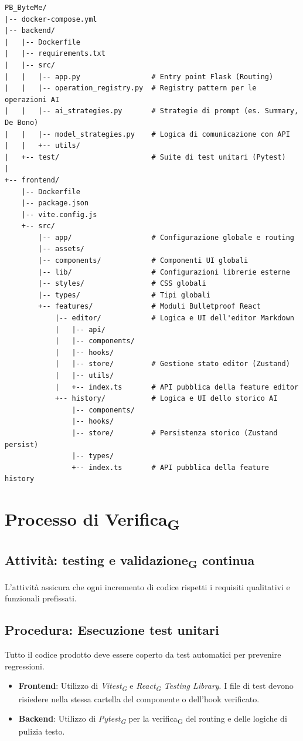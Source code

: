 \documentclass[11pt,a4paper]{article}
\newcommand{\gls}[1]{#1\textsubscript{G}}
\begin{document}
\begin{verbatim}
PB_ByteMe/
|-- docker-compose.yml
|-- backend/
|   |-- Dockerfile
|   |-- requirements.txt
|   |-- src/
|   |   |-- app.py                 # Entry point Flask (Routing)
|   |   |-- operation_registry.py  # Registry pattern per le operazioni AI
|   |   |-- ai_strategies.py       # Strategie di prompt (es. Summary, De Bono)
|   |   |-- model_strategies.py    # Logica di comunicazione con API
|   |   +-- utils/
|   +-- test/                      # Suite di test unitari (Pytest)
|
+-- frontend/
    |-- Dockerfile
    |-- package.json
    |-- vite.config.js
    +-- src/
        |-- app/                   # Configurazione globale e routing
        |-- assets/
        |-- components/            # Componenti UI globali
        |-- lib/                   # Configurazioni librerie esterne
        |-- styles/                # CSS globali
        |-- types/                 # Tipi globali
        +-- features/              # Moduli Bulletproof React
            |-- editor/            # Logica e UI dell'editor Markdown
            |   |-- api/
            |   |-- components/
            |   |-- hooks/
            |   |-- store/         # Gestione stato editor (Zustand)
            |   |-- utils/
            |   +-- index.ts       # API pubblica della feature editor
            +-- history/           # Logica e UI dello storico AI
                |-- components/
                |-- hooks/
                |-- store/         # Persistenza storico (Zustand persist)
                |-- types/
                +-- index.ts       # API pubblica della feature history
\end{verbatim}

\newpage

\section{Processo di \gls{Verifica}}
\subsection{Attività: testing e \gls{validazione} continua}
L'attività assicura che ogni incremento di codice rispetti i requisiti qualitativi e funzionali prefissati.

\subsection{Procedura: Esecuzione test unitari}
Tutto il codice prodotto deve essere coperto da test automatici per prevenire regressioni.
\begin{itemize}
    \item \textbf{Frontend}: Utilizzo di \textit{\gls{Vitest}} e \textit{\gls{React} Testing Library}. I file di test devono risiedere nella stessa cartella del componente o dell'hook verificato.
    \item \textbf{Backend}: Utilizzo di \textit{\gls{Pytest}} per la \gls{verifica} del routing e delle logiche di pulizia testo.
\end{itemize}
\end{document}
